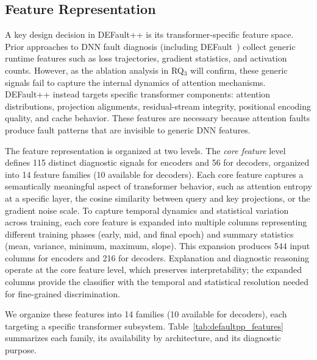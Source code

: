 \subsection{Feature Representation}
\label{sec:defaultpp_features}

A key design decision in DEFault++ is its transformer-specific feature space. Prior approaches to DNN fault diagnosis (including DEFault~\cite{default}) collect generic runtime features such as loss trajectories, gradient statistics, and activation counts. However, as the ablation analysis in RQ$_3$ will confirm, these generic signals fail to capture the internal dynamics of attention mechanisms. DEFault++ instead targets specific transformer components: attention distributions, projection alignments, residual-stream integrity, positional encoding quality, and cache behavior. These features are necessary because attention faults produce fault patterns that are invisible to generic DNN features.

The feature representation is organized at two levels. The \emph{core feature} level defines 115 distinct diagnostic signals for encoders and 56 for decoders, organized into 14 feature families (10 available for decoders). Each core feature captures a semantically meaningful aspect of transformer behavior, such as attention entropy at a specific layer, the cosine similarity between query and key projections, or the gradient noise scale. To capture temporal dynamics and statistical variation across training, each core feature is expanded into multiple columns representing different training phases (early, mid, and final epoch) and summary statistics (mean, variance, minimum, maximum, slope). This expansion produces 544 input columns for encoders and 216 for decoders. Explanation and diagnostic reasoning operate at the core feature level, which preserves interpretability; the expanded columns provide the classifier with the temporal and statistical resolution needed for fine-grained discrimination.

We organize these features into 14 families (10 available for decoders), each targeting a specific transformer subsystem. Table~\ref{tab:defaultpp_features} summarizes each family, its availability by architecture, and its diagnostic purpose.

